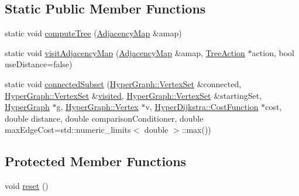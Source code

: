 \subsection*{Static Public Member Functions}
\begin{DoxyCompactItemize}
\item 
static void \mbox{\hyperlink{structg2o_1_1_hyper_dijkstra_a84a1d7288e1d76369442f89604c5d6de}{compute\+Tree}} (\mbox{\hyperlink{structg2o_1_1_hyper_dijkstra_af12ff8eef95094815a3fa1da0514bda2}{Adjacency\+Map}} \&amap)
\item 
static void \mbox{\hyperlink{structg2o_1_1_hyper_dijkstra_aa73ae495f10f81823b16f26715f32c58}{visit\+Adjacency\+Map}} (\mbox{\hyperlink{structg2o_1_1_hyper_dijkstra_af12ff8eef95094815a3fa1da0514bda2}{Adjacency\+Map}} \&amap, \mbox{\hyperlink{structg2o_1_1_hyper_dijkstra_1_1_tree_action}{Tree\+Action}} $\ast$action, bool use\+Distance=false)
\item 
static void \mbox{\hyperlink{structg2o_1_1_hyper_dijkstra_a846232e98c8175ec2fff784fc3271ad7}{connected\+Subset}} (\mbox{\hyperlink{classg2o_1_1_hyper_graph_a703938cdb4bb636860eed55a2489d70c}{Hyper\+Graph\+::\+Vertex\+Set}} \&connected, \mbox{\hyperlink{classg2o_1_1_hyper_graph_a703938cdb4bb636860eed55a2489d70c}{Hyper\+Graph\+::\+Vertex\+Set}} \&\mbox{\hyperlink{structg2o_1_1_hyper_dijkstra_a2cb453ed6f1bf6069186bd269a6464da}{visited}}, \mbox{\hyperlink{classg2o_1_1_hyper_graph_a703938cdb4bb636860eed55a2489d70c}{Hyper\+Graph\+::\+Vertex\+Set}} \&starting\+Set, \mbox{\hyperlink{classg2o_1_1_hyper_graph}{Hyper\+Graph}} $\ast$g, \mbox{\hyperlink{classg2o_1_1_hyper_graph_1_1_vertex}{Hyper\+Graph\+::\+Vertex}} $\ast$v, \mbox{\hyperlink{structg2o_1_1_hyper_dijkstra_1_1_cost_function}{Hyper\+Dijkstra\+::\+Cost\+Function}} $\ast$cost, double distance, double comparison\+Conditioner, double max\+Edge\+Cost=std\+::numeric\+\_\+limits$<$ double $>$\+::max())
\end{DoxyCompactItemize}
\subsection*{Protected Member Functions}
\begin{DoxyCompactItemize}
\item 
void \mbox{\hyperlink{structg2o_1_1_hyper_dijkstra_ad9c39fd01a0740f2beff98c927aaebbd}{reset}} ()
\end{DoxyCompactItemize}

